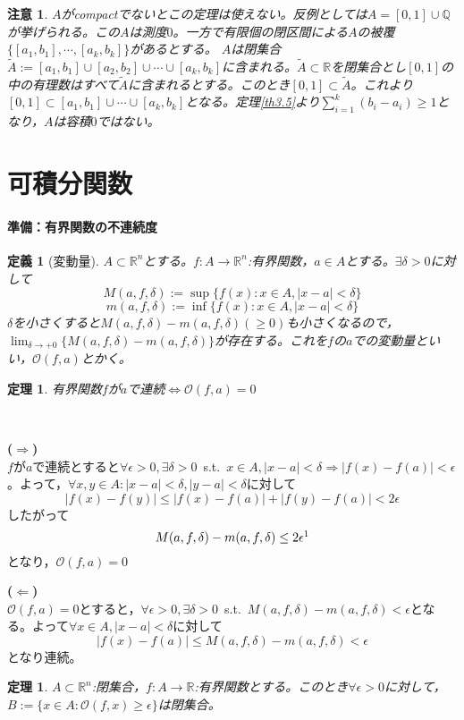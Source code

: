 \documentclass[dvipdfmx,a4j,10pt]{jsarticle}
\makeatletter
\theoremstyle{mystyle1}
\newtheorem{thm}[dfn]{定理}
\theoremstyle{mystyle2}
\newtheorem{dfn*}{定義}
\newtheorem{thm*}{定理}
\newtheorem{note}{注意}
\renewenvironment{proof}[1][\proofname]{\par
  \pushQED{\qed}%
  \normalfont
  \topsep6\p@\@plus6\p@ \trivlist
  \item[\hskip\labelsep{\bfseries\sffamily #1}]\ignorespaces
}{%
  \popQED\endtrivlist\@endpefalse
}
\renewcommand\proofname{証明}
\makeatother
\begin{document}
\begin{note}
	$A$がcompactでないとこの定理は使えない。反例としては$A=[0,1]\cup\mathbb{Q}$が挙げられる。この$A$は測度$0$。一方で有限個の閉区間による$A$の被覆$\{[a_1,b_1],\cdots,[a_k,b_k]\}$があるとする。
	$A$は閉集合$\tilde{A}:=[a_1,b_1]\cup[a_2,b_2]\cup\cdots\cup[a_k,b_k]$に含まれる。$\tilde{A}\subset\mathbb{R}$を閉集合とし$[0,1]$の中の有理数はすべて$\tilde{A}$に含まれるとする。このとき$[0,1]\subset\tilde{A}$。これより$[0,1]\subset[a_1,b_1]\cup\cdots\cup[a_k,b_k]$となる。定理\ref{th3.5}より$\displaystyle\sum_{i=1}^k(b_i-a_i)\geq 1$となり，$A$は容積$0$ではない。
\end{note}


\newpage


\section{可積分関数}
\paragraph{準備：有界関数の不連続度}
\begin{dfn*}[変動量]
$A\subset \mathbb{R}^n$とする。$f:A\to\mathbb{R}^n$:有界関数，$a\in A$とする。$\exists\delta>0$に対して
\[
	M(a,f,\delta):=\sup\{f(x):x\in A,|x-a|<\delta\}
\]
\[
	m(a,f,\delta):=\inf\{f(x):x\in A,|x-a|<\delta\}
\]
$\delta$を小さくすると$M(a,f,\delta)-m(a,f,\delta)(\geq 0)$も小さくなるので，$\displaystyle\lim_{\delta\to+0}\{M(a,f,\delta)-m(a,f,\delta)\}$が存在する。これを$f$の$a$での変動量といい，$\mathscr{O}(f,a)$とかく。
\end{dfn*}
\begin{thm*}
有界関数$f$が$a$で連続$\Leftrightarrow$$\mathscr{O}(f,a)=0$
\end{thm*}
\begin{proof}\
	\par\noindent\textbf{($\Rightarrow$)}\\
	$f$が$a$で連続とすると$\forall\epsilon>0,\exists\delta>0$\ s.t.\ $x\in A,|x-a|<\delta\Rightarrow|f(x)-f(a)|<\epsilon$。よって，$\forall x,y\in A:|x-a|<\delta,|y-a|<\delta$に対して
	\[
	|f(x)-f(y)|\leq |f(x)-f(a)|+|f(y)-f(a)|< 2\epsilon
	\]
	したがって
	\[
	M(a,f,\delta)-m(a,f,\delta)\leq 2\epsilon \footnotemark
	\]
	となり，$\mathscr{O}(f,a)=0$\\
	\par\noindent\textbf{($\Leftarrow$)}\\
	$\mathscr{O}(f,a)=0$とすると，$\forall\epsilon>0,\exists\delta>0$\ s.t.\ $M(a,f,\delta)-m(a,f,\delta)<\epsilon$となる。よって$\forall x\in A,|x-a|<\delta$に対して
	\[
		|f(x)-f(a)|\leq M(a,f,\delta)-m(a,f,\delta)<\epsilon
	\]
	となり連続。
\end{proof}
\begin{framed}
	\begin{thm}\label{th3.7}
		$A\subset\mathbb{R}^n$:閉集合，$f:A\to\mathbb{R}$:有界関数とする。このとき$\forall\epsilon>0$に対して，$B:=\{x\in A:\mathscr{O}(f,x)\geq \epsilon\}$は閉集合。
	\end{thm}
\end{framed}
\end{document}
